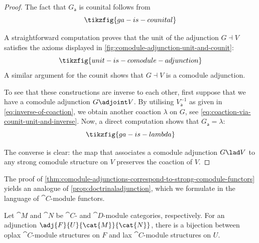 \begin{proof}
  The fact that \(G_{\mathsf{a}}\) is counital follows from
  \[
    \tikzfig{ga-is-counital}
  \]

  A straightforward computation proves that the unit of the adjunction \(G \dashv V\) satisfies
  the axioms displayed in \cref{fig:comodule-adjunction-unit-and-counit}:
  \[
    \tikzfig{unit-is-comodule-adjunction}
  \]
  A similar argument for the counit shows that \(G \dashv V\) is a comodule adjunction.

  To see that these constructions are inverse to each other,
  first suppose that we have a comodule adjunction \(G \adjoint V\).
  By utilising \(V_{\mathsf{a}}^{-1}\) as given in \cref{eq:inverse-of-coaction}, we obtain another coaction \(\lambda\) on \(G\),
  see \cref{eq:coaction-via-counit-unit-and-inverse}.
  Now, a direct computation shows that \(G_{\mathsf{a}} = \lambda\):
  \[
    \tikzfig{ga-is-lambda}
  \]

  The converse is clear:
  the map that associates a comodule adjunction \(G \lad V\) to any strong comodule structure on \(V\)
  preserves the coaction of \(V\).
\end{proof}

The proof of \cref{thm:comodule-adjunctions-correspond-to-strong-comodule-functors}
yields an analogue of \cref{prop:doctrinaladjunction},
which we formulate in the language of \(\cat{C}\)\hyp{}module functors.

\begin{porism}\label{porism:doctrinal-module-adjunctions}
  Let \(\cat{M}\) and \(\cat{N}\) be \(\cat{C}\)\hyp{} and \(\cat{D}\)\hyp{}module categories, respectively.
  For an adjunction \(\adj{F}{U}{\cat{M}}{\cat{N}}\),
  there is a bijection between oplax \(\cat{C}\)\hyp{}module structures on \(F\)
  and lax \(\cat{C}\)\hyp{}module structures on \(U\).
\end{porism}

